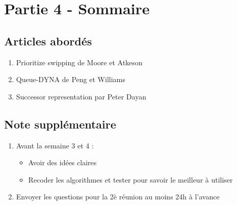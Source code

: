 \documentclass{article}
\begin{document}
\section{Partie 4 - Sommaire}
\subsection{Articles abordés}
\begin{enumerate}
    \item Prioritize swipping de Moore et Atkeson
    \item Queue-DYNA de Peng et Williams
    \item Successor representation par Peter Dayan
\end{enumerate}
\subsection{Note supplémentaire}
\begin{enumerate}
    \item Avant la semaine 3 et 4 : 
    \begin{itemize}
        \item Avoir des idées claires
        \item Recoder les algorithmes et tester pour savoir le meilleur à utiliser
    \end{itemize}
    \item Envoyer les questions pour la 2è réunion au moins 24h à l'avance
\end{enumerate}
\end{document}
